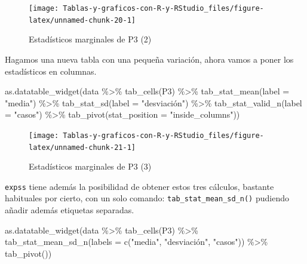 \documentclass[
]{book}
\newenvironment{Shaded}{\begin{snugshade}}{\end{snugshade}}
\newcommand{\AttributeTok}[1]{\textcolor[rgb]{0.77,0.63,0.00}{#1}}
\newcommand{\FunctionTok}[1]{\textcolor[rgb]{0.00,0.00,0.00}{#1}}
\newcommand{\NormalTok}[1]{#1}
\newcommand{\SpecialCharTok}[1]{\textcolor[rgb]{0.00,0.00,0.00}{#1}}
\newcommand{\StringTok}[1]{\textcolor[rgb]{0.31,0.60,0.02}{#1}}
\begin{document}
\begin{figure}[H]

{\centering \texttt{[image: Tablas-y-graficos-con-R-y-RStudio\_files/figure-latex/unnamed-chunk-20-1]} 

}

\caption{Estadísticos marginales de P3 (2)}\label{fig:unnamed-chunk-20}
\end{figure}

Hagamos una nueva tabla con una pequeña variación, ahora vamos a poner los estadísticos en columnas.

\begin{Shaded}
\begin{Highlighting}[]
\FunctionTok{as.datatable\_widget}\NormalTok{(data }\SpecialCharTok{\%\textgreater{}\%}
  \FunctionTok{tab\_cells}\NormalTok{(P3) }\SpecialCharTok{\%\textgreater{}\%}
  \FunctionTok{tab\_stat\_mean}\NormalTok{(}\AttributeTok{label =} \StringTok{"media"}\NormalTok{) }\SpecialCharTok{\%\textgreater{}\%}
  \FunctionTok{tab\_stat\_sd}\NormalTok{(}\AttributeTok{label =} \StringTok{"desviación"}\NormalTok{) }\SpecialCharTok{\%\textgreater{}\%}
  \FunctionTok{tab\_stat\_valid\_n}\NormalTok{(}\AttributeTok{label =} \StringTok{"casos"}\NormalTok{) }\SpecialCharTok{\%\textgreater{}\%}
  \FunctionTok{tab\_pivot}\NormalTok{(}\AttributeTok{stat\_position =} \StringTok{"inside\_columns"}\NormalTok{))}
\end{Highlighting}
\end{Shaded}

\begin{figure}[H]

{\centering \texttt{[image: Tablas-y-graficos-con-R-y-RStudio\_files/figure-latex/unnamed-chunk-21-1]} 

}

\caption{Estadísticos marginales de P3 (3)}\label{fig:unnamed-chunk-21}
\end{figure}

\texttt{expss} tiene además la posibilidad de obtener estos tres cálculos, bastante habituales por cierto, con un solo comando: \texttt{tab\_stat\_mean\_sd\_n()} pudiendo añadir además etiquetas separadas.

\begin{Shaded}
\begin{Highlighting}[]
\FunctionTok{as.datatable\_widget}\NormalTok{(data }\SpecialCharTok{\%\textgreater{}\%}
  \FunctionTok{tab\_cells}\NormalTok{(P3) }\SpecialCharTok{\%\textgreater{}\%}
  \FunctionTok{tab\_stat\_mean\_sd\_n}\NormalTok{(}\AttributeTok{labels =} \FunctionTok{c}\NormalTok{(}\StringTok{"media"}\NormalTok{, }\StringTok{"desviación"}\NormalTok{,}
    \StringTok{"casos"}\NormalTok{)) }\SpecialCharTok{\%\textgreater{}\%}
  \FunctionTok{tab\_pivot}\NormalTok{())}
\end{Highlighting}
\end{Shaded}
\end{document}
